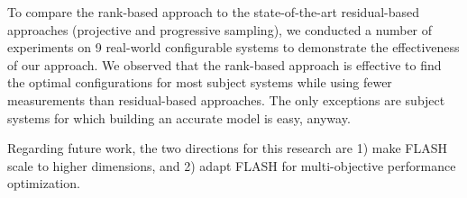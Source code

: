 \documentclass[sigconf]{acmart}
\begin{document}
To compare the rank-based approach to the state-of-the-art residual-based approaches (projective and progressive sampling), we conducted  a number of experiments on 9 real-world configurable systems to demonstrate the effectiveness of our approach. We observed that the rank-based approach is effective to find the optimal configurations for most subject systems while using fewer measurements than residual-based approaches. The only exceptions are subject systems for which building an accurate model is easy, anyway. 

Regarding future work, the two directions for this research
are 1) make FLASH scale to higher dimensions, and 2) adapt FLASH for multi-objective performance optimization.
 


%


\balance



 






\end{document}
